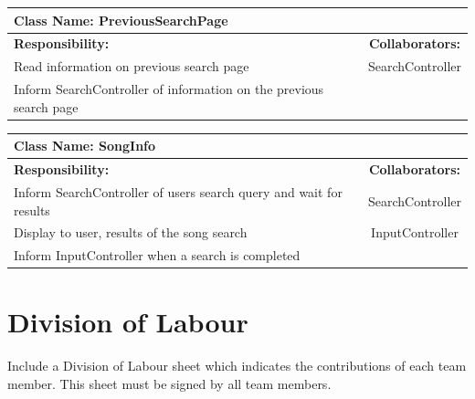 \documentclass[]{article}
\begin{document}
	\begin{table}[!htb]
		\centering
		\begin{tabular}{| p{8cm} | c |} \hline
			\multicolumn{2}{|l|}{\textbf{Class Name: PreviousSearchPage}} \\ \hline
			\textbf{Responsibility:} & \textbf{Collaborators:} \\ \hline
			Read information on previous search page & SearchController \\ \hline
			Inform SearchController of information on the previous search page &   \\ \hline
		\end{tabular}
	\end{table}
	
	\begin{table}[!htb]
		\centering
		\begin{tabular}{| p{8cm} | c |} \hline
			\multicolumn{2}{|l|}{\textbf{Class Name: SongInfo}} \\ \hline
			\textbf{Responsibility:} & \textbf{Collaborators:} \\ \hline
			Inform SearchController of users search query and wait for results & SearchController \\ \hline
			Display to user, results of the song search & InputController \\ \hline
			Inform InputController when a search is completed &   \\ \hline
		\end{tabular}
	\end{table}


\appendix
\section{Division of Labour}
\label{sec:division_of_labour}
Include a Division of Labour sheet which indicates the contributions of each team member. This sheet must be signed by all team members.
\end{document}
